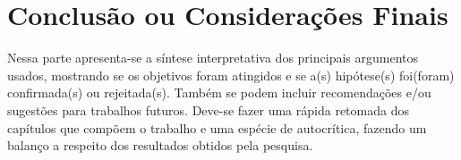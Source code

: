 \chapter{Conclusão ou Considerações Finais}

Nessa parte apresenta-se a síntese interpretativa dos principais argumentos usados, mostrando se os objetivos foram atingidos e se a(s) hipótese(s) foi(foram) confirmada(s) ou rejeitada(s). Também se podem incluir recomendações e/ou sugestões para trabalhos futuros. 
Deve-se fazer uma rápida retomada dos capítulos que compõem o trabalho e uma espécie de autocrítica, fazendo um balanço a respeito dos resultados obtidos pela pesquisa.